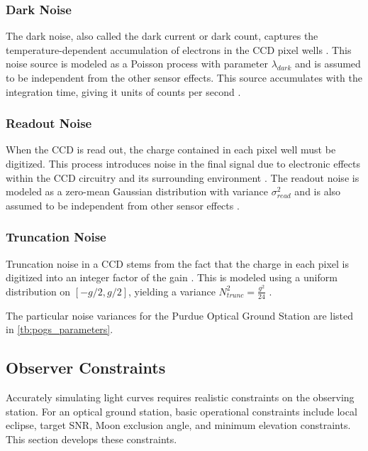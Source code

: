 \subsubsection{Dark Noise}

The dark noise, also called the dark current or dark count, captures the temperature-dependent accumulation of electrons in the CCD pixel wells \cite{krag2003}. This noise source is modeled as a Poisson process with parameter $\lambda_{dark}$ \cite{frueh2019notes} and is assumed to be independent from the other sensor effects. This source accumulates with the integration time, giving it units of counts per second \cite{krag2003}.

\subsubsection{Readout Noise}

When the CCD is read out, the charge contained in each pixel well must be digitized. This process introduces noise in the final signal due to electronic effects within the CCD circuitry and its surrounding environment \cite{krag2003}. The readout noise is modeled as a zero-mean Gaussian distribution with variance $\sigma_{read}^2$ and is also assumed to be independent from other sensor effects \cite{frueh2019notes}.

\subsubsection{Truncation Noise}

Truncation noise in a CCD stems from the fact that the charge in each pixel is digitized into an integer factor of the gain \cite{frueh2019notes}. This is modeled using a uniform distribution on $\left[ -g/2, g/2 \right]$, yielding a variance $N^2_{trunc} = \frac{g^2}{24}$ \cite{frueh2019notes}.

The particular noise variances for the Purdue Optical Ground Station are listed in \ref{tb:pogs_parameters}.

\subsection{Observer Constraints}

Accurately simulating light curves requires realistic constraints on the observing station. For an optical ground station, basic operational constraints include local eclipse, target SNR, Moon exclusion angle, and minimum elevation constraints. This section develops these constraints.

